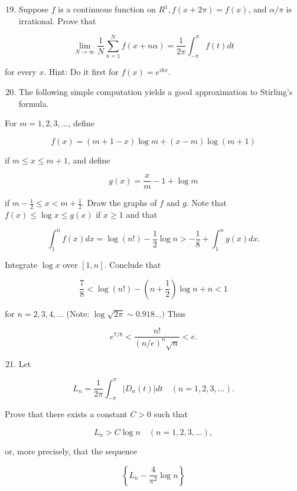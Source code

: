 \documentclass[10pt]{article}
\begin{document}
\begin{enumerate}
  \setcounter{enumi}{18}
  \item Suppose $f$ is a continuous function on $R^{1}, f(x+2 \pi)=f(x)$, and $\alpha / \pi$ is irrational. Prove that
\end{enumerate}

$$
\lim _{N \rightarrow \infty} \frac{1}{N} \sum_{n=1}^{N} f(x+n \alpha)=\frac{1}{2 \pi} \int_{-\pi}^{\pi} f(t) d t
$$

for every $x$. Hint: Do it first for $f(x)=e^{i k x}$.

\begin{enumerate}
  \setcounter{enumi}{19}
  \item The following simple computation yields a good approximation to Stirling's formula.
\end{enumerate}

For $m=1,2,3, \ldots$, define

$$
f(x)=(m+1-x) \log m+(x-m) \log (m+1)
$$

if $m \leq x \leq m+1$, and define

$$
g(x)=\frac{x}{m}-1+\log m
$$

if $m-\frac{1}{2} \leq x<m+\frac{1}{2}$. Draw the graphs of $f$ and $g$. Note that $f(x) \leq \log x \leq g(x)$ if $x \geq 1$ and that

$$
\int_{1}^{n} f(x) d x=\log (n !)-\frac{1}{2} \log n>-\frac{1}{8}+\int_{1}^{n} g(x) d x .
$$

Integrate $\log x$ over $[1, n]$. Conclude that

$$
\frac{7}{8}<\log (n !)-\left(n+\frac{1}{2}\right) \log n+n<1
$$

for $n=2,3,4, \ldots$ (Note: $\log \sqrt{2 \pi} \sim 0.918 \ldots)$ Thus

$$
e^{7 / 8}<\frac{n !}{(n / e)^{n} \sqrt{n}}<e .
$$

\begin{enumerate}
  \setcounter{enumi}{20}
  \item Let
\end{enumerate}

$$
L_{n}=\frac{1}{2 \pi} \int_{-\pi}^{\pi}\left|D_{n}(t)\right| d t \quad(n=1,2,3, \ldots) .
$$

Prove that there exists a constant $C>0$ such that

$$
L_{n}>C \log n \quad(n=1,2,3, \ldots),
$$

or, more precisely, that the sequence

$$
\left\{L_{n}-\frac{4}{\pi^{2}} \log n\right\}
$$
\end{document}
